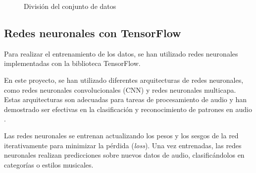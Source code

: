 \begin{figure}
  \centering
  \caption{División del conjunto de datos}
\end{figure}

\subsection{Redes neuronales con TensorFlow}

Para realizar el entrenamiento de los datos, se han utilizado redes neuronales implementadas con la biblioteca TensorFlow.

En este proyecto, se han utilizado diferentes arquitecturas de redes neuronales, como redes neuronales convolucionales (CNN) y redes neuronales multicapa.
Estas arquitecturas son adecuadas para tareas de procesamiento de audio y han demostrado ser efectivas en la clasificación y reconocimiento de patrones en audio \cite{article_cnn}. 

Las redes neuronales se entrenan actualizando los pesos y los sesgos de la red iterativamente para minimizar la pérdida (\textit{loss}). Una vez entrenadas, las redes neuronales realizan predicciones sobre nuevos datos de audio, clasificándolos en categorías o estilos musicales.